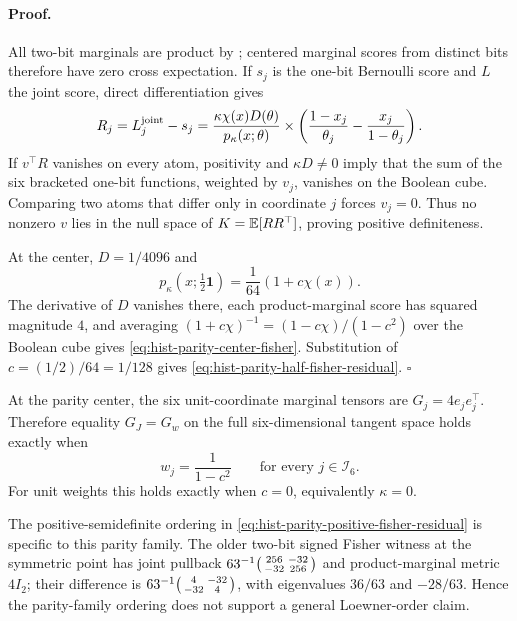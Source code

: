 \paragraph{Proof.}
All two-bit marginals are product by
; centered marginal scores from
distinct bits therefore have zero cross expectation.  If \(s_j\) is the
one-bit Bernoulli score and \(L\) the joint score, direct differentiation
gives
\begin{equation}
R_j=L_j^{\rm joint}-s_j
=\frac{\kappa\chi(x)D(\theta)}{p_\kappa(x;\theta)}
\times
\left(\frac{1-x_j}{\theta_j}-\frac{x_j}{1-\theta_j}\right).
\label{eq:hist-parity-score-residual-coordinate}
\end{equation}
If \(v^\top R\) vanishes on every atom, positivity and
\(\kappa D\ne0\) imply that the sum of the six bracketed one-bit functions,
weighted by \(v_j\), vanishes on the Boolean cube.  Comparing two atoms that
differ only in coordinate \(j\) forces \(v_j=0\).  Thus no nonzero \(v\)
lies in the null space of \(K=\mathbb E[RR^\top]\), proving positive definiteness.

At the center, \(D=1/4096\) and
\begin{equation}
p_\kappa(x;\tfrac12\mathbf1)
=\frac1{64}\left(1+c\chi(x)\right).
\label{eq:hist-parity-center-law}
\end{equation}
The derivative of \(D\) vanishes there, each product-marginal score has
squared magnitude \(4\), and averaging
\((1+c\chi)^{-1}=(1-c\chi)/(1-c^2)\) over the Boolean cube gives
\eqref{eq:hist-parity-center-fisher}.  Substitution of
\(c=(1/2)/64=1/128\) gives
\eqref{eq:hist-parity-half-fisher-residual}.  \(\square\)

At the parity center, the six unit-coordinate marginal tensors are
\(G_j=4e_je_j^\top\).  Therefore equality \(G_J=G_w\) on the full
six-dimensional tangent space holds exactly when
\begin{equation}
w_j=\frac{1}{1-c^2}
\qquad\text{for every }j\in\mathcal I_6.
\label{eq:hist-parity-center-weight-equality}
\end{equation}
For unit weights this holds exactly when \(c=0\), equivalently
\(\kappa=0\).  

The positive-semidefinite ordering in
\eqref{eq:hist-parity-positive-fisher-residual} is specific to this parity
family.  The older two-bit signed Fisher witness at the symmetric point has
joint pullback
\(63^{-1}\begin{psmallmatrix}256&-32\\-32&256\end{psmallmatrix}\) and
product-marginal metric \(4I_2\); their difference is
\(63^{-1}\begin{psmallmatrix}4&-32\\-32&4\end{psmallmatrix}\), with
eigenvalues \(36/63\) and \(-28/63\).  Hence the parity-family ordering does
not support a general Loewner-order claim.  


